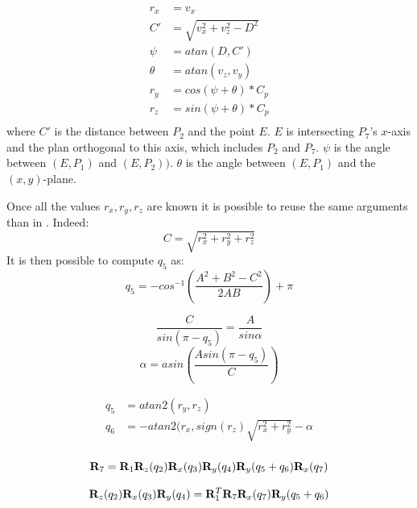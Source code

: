 \begin{equation}
\begin{aligned}
r_x &= v_x \\
C' &= \sqrt{v_x^2 + v_z^2 - D^2} \\
\psi &= atan(D,C') \\
\theta &= atan(v_z, v_y) \\
r_y &= cos(\psi+\theta) *C_p \\
r_z &= sin(\psi+\theta) *C_p \\
\end{aligned}
\end{equation}
where $C'$ is the distance between $P_2$ and the point $E$. $E$ is intersecting $P_7$'s $x$-axis and 
the plan orthogonal to this axis, which includes $P_2$ and $P_7$.
$\psi$ is the angle between $(E, P_1)$ and $(E,P_2))$.
$\theta$ is the angle between $(E,P_1)$ and the $(x,y)$-plane.

Once all the values ${ r_x, r_y, r_z}$ are known 
it is possible to reuse the same arguments than in \cite{Kajita2003}.
Indeed:
\begin{equation*}
C = \sqrt{r_x^2 + r_y^2 + r_z^2}
\end{equation*}
It is then possible to compute $q_5$ as:
\begin{equation*}
q_5 = -cos^{-1}( \frac{A^2 + B^2 - C^2}{2AB}) + \pi
\end{equation*}

\begin{equation*}
\frac{C}{sin(\pi - q_5)}= \frac{A}{sin \alpha}
\end{equation*}
\begin{equation*}
\alpha = asin( \frac{A sin(\pi - q_5)}{C})
\end{equation*}

\begin{equation*}
\begin{aligned}
q_5 &= atan2(r_y,r_z)\\
q_6 &= -atan2(r_x,sign(r_z)\sqrt{r_x^2 + r_y^2} - \alpha\\
\end{aligned}
\end{equation*}


\begin{equation*}
{\bf R}_7 = {\bf R}_1 {\bf R}_z(q_2){\bf R}_x(q_3){\bf R}_y(q_4) {\bf R}_y(q_5+q_6) {\bf R}_x(q_7)
\end{equation*}

\begin{equation*}
{\bf R}_z(q_2) {\bf R}_x(q_3) {\bf R}_y(q_4) = {\bf R}^T_1 {\bf R}_7 {\bf R}_x(q_7) {\bf R}_y (q_5 +q_6)
\end{equation*}

